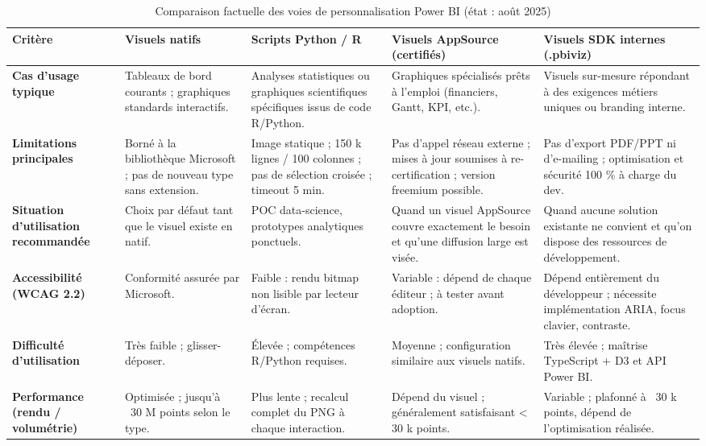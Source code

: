 \begin{sidewaystable}[p]
\footnotesize
\centering
\caption{Comparaison factuelle des voies de personnalisation Power BI (état : août 2025)}
\label{tab:comparaison-approches}
\begin{tabularx}{\linewidth}{>{\raggedright\arraybackslash\bfseries}p{2.9cm}XXXX}
\toprule
\textbf{Critère} &
\textbf{Visuels natifs} &
\textbf{Scripts Python / R} &
\textbf{Visuels AppSource (certifiés)} &
\textbf{Visuels SDK internes (.pbiviz)} \\
\midrule
Cas d’usage typique &
Tableaux de bord courants ; graphiques standards interactifs. &
Analyses statistiques ou graphiques scientifiques spécifiques issus de code R/Python. &
Graphiques spécialisés prêts à l’emploi (financiers, Gantt, KPI, etc.). &
Visuels sur-mesure répondant à des exigences métiers uniques ou branding interne.\\[0.4em]

Limitations principales &
Borné à la bibliothèque Microsoft ; pas de nouveau type sans extension. &
Image statique ; 150 k lignes / 100 colonnes ; pas de sélection croisée ; timeout 5 min. &
Pas d’appel réseau externe ; mises à jour soumises à re-certification ; version freemium possible. &
Pas d’export PDF/PPT ni d’e-mailing ; optimisation et sécurité 100 \% à charge du dev.\\[0.4em]

Situation d’utilisation recommandée &
Choix par défaut tant que le visuel existe en natif. &
POC data-science, prototypes analytiques ponctuels. &
Quand un visuel AppSource couvre exactement le besoin et qu’une diffusion large est visée. &
Quand aucune solution existante ne convient et qu’on dispose des ressources de développement.\\[0.4em]

Accessibilité (WCAG 2.2) &
Conformité assurée par Microsoft. &
Faible : rendu bitmap non lisible par lecteur d’écran. &
Variable : dépend de chaque éditeur ; à tester avant adoption. &
Dépend entièrement du développeur ; nécessite implémentation ARIA, focus clavier, contraste.\\[0.4em]

Difficulté d’utilisation &
Très faible ; glisser-déposer. &
Élevée ; compétences R/Python requises. &
Moyenne ; configuration similaire aux visuels natifs. &
Très élevée ; maîtrise TypeScript + D3 et API Power BI.\\[0.4em]

Performance (rendu / volumétrie) &
Optimisée ; jusqu’à ~30 M points selon le type. &
Plus lente ; recalcul complet du PNG à chaque interaction. &
Dépend du visuel ; généralement satisfaisant < 30 k points. &
Variable ; plafonné à ~30 k points, dépend de l’optimisation réalisée.\\[0.4em]


\end{tabularx}
\end{sidewaystable}
